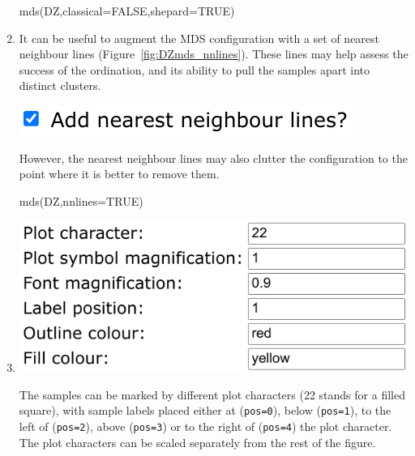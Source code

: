 \begin{refsection}
\begin{enumerate}
\begin{console}
mds(DZ,classical=FALSE,shepard=TRUE)
\end{console}

\item It can be useful to augment the MDS configuration with a set of
  nearest neighbour lines (Figure~\ref{fig:DZmds_nnlines}). These
  lines may help assess the success of the ordination, and its ability
  to pull the samples apart into distinct clusters.
  
\noindent\begin{minipage}[t]{.32\linewidth}
\strut\vspace*{-\baselineskip}\newline
\includegraphics[width=\linewidth]{../figures/detritalMDSnnlines.png}
\end{minipage}
\begin{minipage}[t]{.68\linewidth}
  However, the nearest neighbour lines may also clutter the
  configuration to the point where it is better to remove them.
\end{minipage}

\begin{console}
mds(DZ,nnlines=TRUE)
\end{console}

\item\noindent\begin{minipage}[t]{.47\linewidth}
\strut\vspace*{-\baselineskip}\newline
\includegraphics[width=\linewidth]{../figures/detritalMDSotheroptions.png}
\end{minipage}
\begin{minipage}[t]{.53\linewidth}
  The samples can be marked by different plot characters (22 stands
  for a filled square), with sample labels placed either at
  (\texttt{pos=0}), below (\texttt{pos=1}), to the left of
  (\texttt{pos=2}), above (\texttt{pos=3}) or to the right of
  (\texttt{pos=4}) the plot character. The plot characters can be
  scaled separately from the rest of the figure.
\end{minipage}


\end{enumerate}
\end{refsection}
